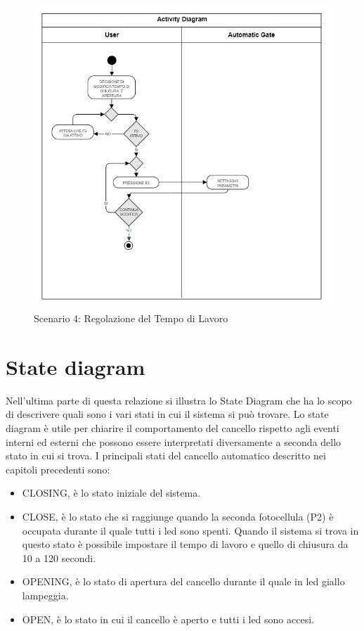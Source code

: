 \documentclass[12pt]{article}
\begin{document}
\begin{figure}[h]
    \centering
    \includegraphics[width = 0.7 \textwidth]{Scenario_4.jpg}
    \caption{Scenario 4: Regolazione del Tempo di Lavoro}
    
\end{figure}

\newpage

\section{State diagram}
Nell'ultima parte di questa relazione si illustra lo State Diagram che ha lo scopo di descrivere quali sono i vari stati in cui il sistema si può trovare. Lo state diagram è utile per chiarire il comportamento del cancello rispetto agli eventi interni ed esterni che possono essere interpretati diversamente a seconda dello stato in cui si trova.
I principali stati del cancello automatico descritto nei capitoli precedenti sono:
\begin{itemize}
    \item{CLOSING,} è lo stato iniziale del sistema.
    \item{CLOSE,} è lo stato che si raggiunge quando la seconda fotocellula (P2) è occupata durante il quale tutti i led sono spenti. Quando il sistema si trova in questo stato è possibile impostare il tempo di lavoro e quello di chiusura da 10 a 120 secondi.
    \item{OPENING,} è lo stato di apertura del cancello durante il quale in led giallo lampeggia.
    \item{OPEN,} è lo stato in cui il cancello è aperto e tutti i led sono accesi.
\end{itemize}
\end{document}
